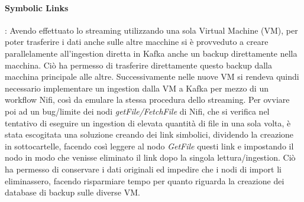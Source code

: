 \documentclass[fleqn,10pt]{SelfArx} %
\begin{document}
{{\paragraph{Symbolic Links}: Avendo effettuato lo streaming utilizzando una sola Virtual Machine (VM), per poter trasferire i dati anche sulle altre macchine si è provveduto a creare parallelamente all'ingestion diretta in Kafka anche un backup direttamente nella macchina. 
Ciò ha permesso di trasferire direttamente questo backup dalla macchina principale alle altre. 
Successivamente nelle nuove VM si rendeva quindi necessario implementare un ingestion dalla VM a Kafka per mezzo di un workflow Nifi, così da emulare la stessa procedura dello streaming. 
Per ovviare poi ad un bug/limite dei nodi \textit{getFile/FetchFile} di Nifi, che si verifica nel tentativo di eseguire un ingestion di elevata quantità di file in una sola volta, è stata escogitata una soluzione creando dei link simbolici, dividendo la creazione in sottocartelle, facendo così leggere al nodo \textit{GetFile} questi link e impostando il nodo in modo che venisse eliminato il link dopo la singola lettura/ingestion. Ciò ha permesso di conservare i dati originali ed impedire che i nodi di import li eliminassero, facendo risparmiare tempo per quanto riguarda la creazione dei database di backup sulle diverse VM.
}}
\end{document}
